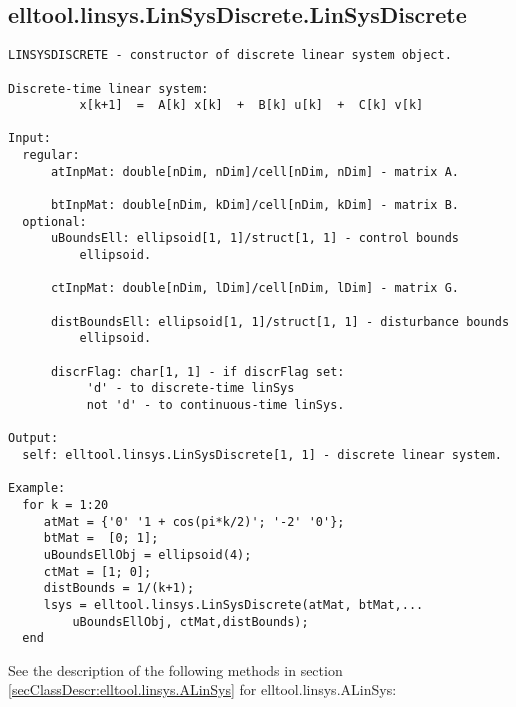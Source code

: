 \subsection{\texorpdfstring{elltool.linsys.LinSysDiscrete.LinSysDiscrete}{LinSysDiscrete}}\label{method:elltool.linsys.LinSysDiscrete.LinSysDiscrete}
\begin{verbatim}
LINSYSDISCRETE - constructor of discrete linear system object.

Discrete-time linear system:
          x[k+1]  =  A[k] x[k]  +  B[k] u[k]  +  C[k] v[k]

Input:
  regular:
      atInpMat: double[nDim, nDim]/cell[nDim, nDim] - matrix A.

      btInpMat: double[nDim, kDim]/cell[nDim, kDim] - matrix B.
  optional:
      uBoundsEll: ellipsoid[1, 1]/struct[1, 1] - control bounds
          ellipsoid.

      ctInpMat: double[nDim, lDim]/cell[nDim, lDim] - matrix G.

      distBoundsEll: ellipsoid[1, 1]/struct[1, 1] - disturbance bounds
          ellipsoid.

      discrFlag: char[1, 1] - if discrFlag set:
           'd' - to discrete-time linSys
           not 'd' - to continuous-time linSys.

Output:
  self: elltool.linsys.LinSysDiscrete[1, 1] - discrete linear system.

Example:
  for k = 1:20
     atMat = {'0' '1 + cos(pi*k/2)'; '-2' '0'};
     btMat =  [0; 1];
     uBoundsEllObj = ellipsoid(4);
     ctMat = [1; 0];
     distBounds = 1/(k+1);
     lsys = elltool.linsys.LinSysDiscrete(atMat, btMat,...
         uBoundsEllObj, ctMat,distBounds);
  end
\end{verbatim}


See the description of the following methods in section \ref{secClassDescr:elltool.linsys.ALinSys}
 for elltool.linsys.ALinSys:

